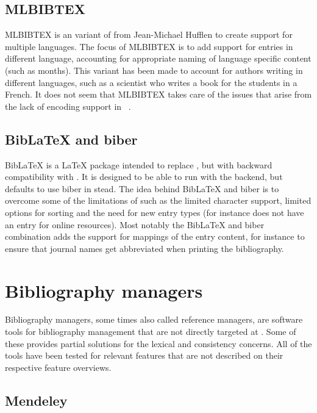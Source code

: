\subsection{MLBIBTEX}
MLBIBTEX is an variant of {\bibtex} from Jean-Michael Hufflen to
create support for multiple languages.  The focus of MLBIBTEX is to
add support for entries in different language, accounting for
appropriate naming of language specific content (such as months).
This variant has been made to account for authors writing in different
languages, such as a scientist who writes a book for the students in a
French.  It does not seem that MLBIBTEX takes care of the issues that
arise from the lack of encoding support in
{\bibtex}~\cite{hufflen2001_mlbibtex}.


\subsection{Bib{\LaTeX} and biber}
Bib{\LaTeX} is a {\LaTeX} package intended to replace {\bibtex}, but
with backward compatibility with {\bibtex}.  It is designed to be able
to run with the {\bibtex} backend, but defaults to use biber in stead.
The idea behind Bib{\LaTeX} and biber is to overcome some of the
limitations of {\bibtex} such as the limited character support,
limited options for sorting and the need for new entry types (for
instance {\bibtex} does not have an entry for online resources).  Most
notably the Bib{\LaTeX} and biber combination adds the support for
mappings of the entry content, for instance to ensure that journal
names get abbreviated when printing the bibliography.


\section{Bibliography managers}
\label{sec:bibliography_managers}

Bibliography managers, some times also called reference managers, are
software tools for bibliography management that are not directly
targeted at {\bibtex}.  Some of these provides partial solutions for
the lexical and consistency concerns.  All of the tools have been
tested for relevant features that are not described on their
respective feature overviews.

\subsection{Mendeley}
\label{sec:related_mendeley}

